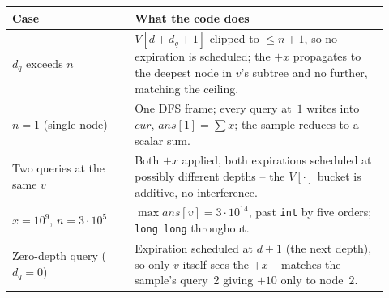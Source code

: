 
\begin{center}\renewcommand{\arraystretch}{1.2}
\begin{tabular}{@{}p{0.30\linewidth} p{0.62\linewidth}@{}}
\toprule
\textbf{Case} & \textbf{What the code does} \\
\midrule
$d_q$ exceeds $n$ & $\mathit{V}[d+d_q+1]$ clipped to $\le n+1$, so no expiration is scheduled; the $+x$ propagates to the deepest node in $v$'s subtree and no further, matching the ceiling. \\
$n = 1$ (single node) & One DFS frame; every query at~$1$ writes into $\mathit{cur}$, $\mathit{ans}[1]=\sum x$; the sample reduces to a scalar sum. \\
Two queries at the same $v$ & Both $+x$ applied, both expirations scheduled at possibly different depths -- the $\mathit{V}[\cdot]$ bucket is additive, no interference. \\
$x = 10^{9}$, $n=3\cdot 10^{5}$ & $\max \mathit{ans}[v]=3\cdot 10^{14}$, past \lstinline{int} by five orders; \lstinline{long long} throughout. \\
Zero-depth query ($d_q=0$) & Expiration scheduled at $d+1$ (the next depth), so only $v$ itself sees the $+x$ -- matches the sample's query~2 giving $+10$ only to node~$2$. \\
\bottomrule
\end{tabular}\end{center}

